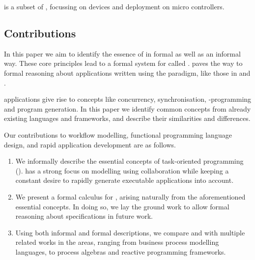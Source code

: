 \MTASKS is a subset of \ITASKS,
focussing on \IOT devices and deployment on micro controllers.




\subsection{Contributions}



In this paper we aim to identify the essence of \TOP in formal as well as an informal way.
These core principles lead to a formal system for \TOP called \TOPHAT.
\TOPHAT paves the way to formal reasoning about applications written using the \TOP paradigm,
like those in \ITASKS and \MTASKS.

\TOP applications give rise to concepts like concurrency, synchronisation, \GUI-programming and program generation.
In this paper we identify common concepts from already existing languages and frameworks,
and describe their similarities and differences.



Our contributions to workflow modelling, functional programming language design, and rapid application development are as follows.

\begin{enumerate}

  \item
    We informally describe the essential concepts of task-oriented programming (\TOP).
    \TOP has a strong focus on modelling using collaboration
    while keeping a constant desire to rapidly generate executable applications into account.

  \item
    We present a formal calculus for \TOP, arising naturally from the aforementioned essential concepts.
    In doing so, we lay the ground work to allow formal reasoning about \TOP specifications in future work.

  \item
    Using both informal and formal descriptions, we compare \TOP and \TOPHAT with multiple related works in the areas,
    ranging from business process modelling languages, to process algebras and reactive programming frameworks.

\end{enumerate}



